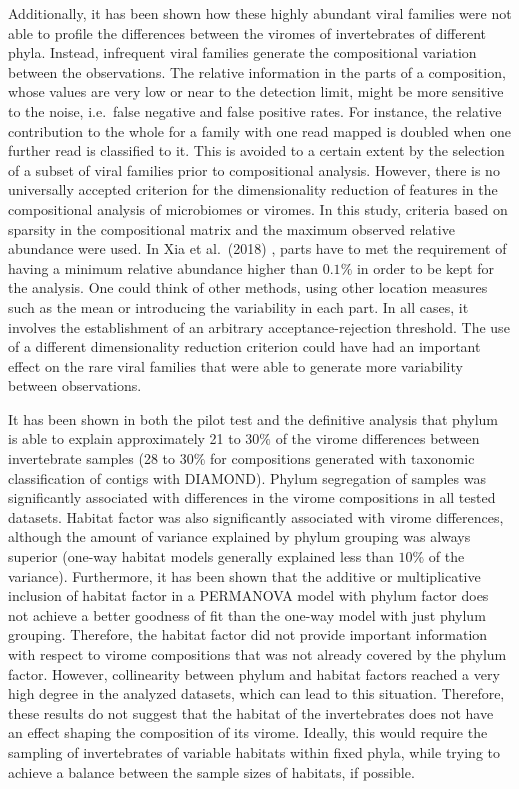 \documentclass[
  openany]{book}
\begin{document}
Additionally, it has been shown how these highly abundant viral families were not able to profile the differences between the viromes of invertebrates of different phyla. Instead, infrequent viral families generate the compositional variation between the observations. The relative information in the parts of a composition, whose values are very low or near to the detection limit, might be more sensitive to the noise, i.e.~false negative and false positive rates. For instance, the relative contribution to the whole for a family with one read mapped is doubled when one further read is classified to it. This is avoided to a certain extent by the selection of a subset of viral families prior to compositional analysis. However, there is no universally accepted criterion for the dimensionality reduction of features in the compositional analysis of microbiomes or viromes. In this study, criteria based on sparsity in the compositional matrix and the maximum observed relative abundance were used. In Xia et al.~(2018) \autocite{Xia2018b}, parts have to met the requirement of having a minimum relative abundance higher than \(0.1\%\) in order to be kept for the analysis. One could think of other methods, using other location measures such as the mean or introducing the variability in each part. In all cases, it involves the establishment of an arbitrary acceptance-rejection threshold. The use of a different dimensionality reduction criterion could have had an important effect on the rare viral families that were able to generate more variability between observations.

It has been shown in both the pilot test and the definitive analysis that phylum is able to explain approximately 21 to 30\(\%\) of the virome differences between invertebrate samples (28 to 30\(\%\) for compositions generated with taxonomic classification of contigs with DIAMOND). Phylum segregation of samples was significantly associated with differences in the virome compositions in all tested datasets. Habitat factor was also significantly associated with virome differences, although the amount of variance explained by phylum grouping was always superior (one-way habitat models generally explained less than \(10\%\) of the variance). Furthermore, it has been shown that the additive or multiplicative inclusion of habitat factor in a PERMANOVA model with phylum factor does not achieve a better goodness of fit than the one-way model with just phylum grouping. Therefore, the habitat factor did not provide important information with respect to virome compositions that was not already covered by the phylum factor. However, collinearity between phylum and habitat factors reached a very high degree in the analyzed datasets, which can lead to this situation. Therefore, these results do not suggest that the habitat of the invertebrates does not have an effect shaping the composition of its virome. Ideally, this would require the sampling of invertebrates of variable habitats within fixed phyla, while trying to achieve a balance between the sample sizes of habitats, if possible.
\end{document}
